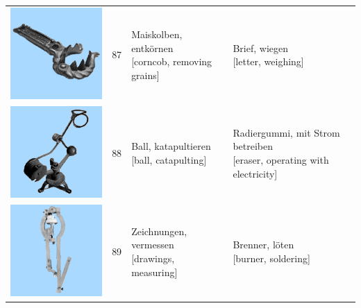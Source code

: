 \documentclass[
  english,
  doc,12pt,twoside,floatsintext]{apa7}
\begin{document}
\begin{center}
\begin{ThreePartTable}
{\begin{longtable}{llll}
\includegraphics[valign=c, scale=0.23]{../materials/unfamiliar/87.png} & 87 & \makecell[l]{Maiskolben, entkörnen\\{[corncob, removing grains]}} & \makecell[l]{Brief, wiegen\\{[letter, weighing]}}\\
\includegraphics[valign=c, scale=0.23]{../materials/unfamiliar/88.png} & 88 & \makecell[l]{Ball, katapultieren\\{[ball, catapulting]}} & \makecell[l]{Radiergummi, mit Strom betreiben\\{[eraser, operating with electricity]}}\\
\includegraphics[valign=c, scale=0.23]{../materials/unfamiliar/89.png} & 89 & \makecell[l]{Zeichnungen, vermessen\\{[drawings, measuring]}} & \makecell[l]{Brenner, löten\\{[burner, soldering]}}\\

\end{longtable}}
\end{ThreePartTable}
\end{center}
\end{document}
